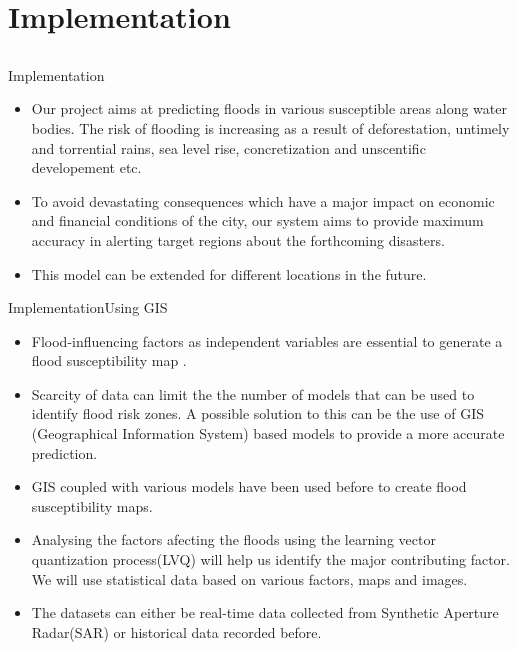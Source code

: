 \documentclass[10pt]{beamer}
\begin{document}
\section{Implementation}
\subsection{}
\begin{frame}{Implementation}


\begin{block}{}
    \begin{itemize}
    \item Our project aims at predicting floods in various susceptible areas along water bodies. The risk of flooding is increasing as a result of deforestation, untimely and torrential rains, sea level rise, concretization and unscentific developement etc. 
    \item To avoid devastating consequences which have a major impact on economic and financial conditions of the city, our system aims to provide maximum accuracy in alerting target regions about the forthcoming disasters.
    \item This model can be extended for different locations in the future.
       
    \end{itemize} 
\end{block}
\end{frame}

\begin{frame}{Implementation}{Using GIS}
\begin{block}{}
\begin{itemize}
\item \small Flood-influencing factors as independent variables are essential to generate a flood susceptibility map . \item Scarcity of data can limit the the number of models that can be used to identify flood risk zones. A possible solution to this can be the use of GIS (Geographical Information System) based models to provide a more accurate prediction.\item  GIS coupled with various models have been used before to create flood susceptibility maps.\item Analysing the factors afecting the floods using the learning vector quantization process(LVQ) will help us identify the major contributing factor. We will use statistical data based on various factors, maps and images. \item The datasets can either be real-time data collected from Synthetic Aperture Radar(SAR) or historical data recorded before.
\end{itemize} 
\end{block}
\end{frame}
\end{document}
